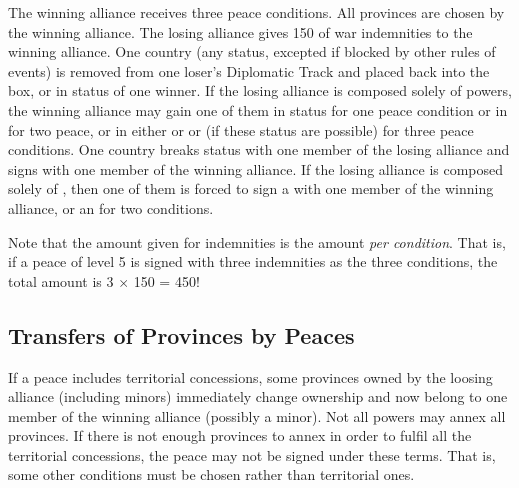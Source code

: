  The winning alliance receives
three peace conditions.
 All provinces are chosen by the winning
alliance.
\bparag[Indemnities] The losing alliance gives 150 \ducats of war indemnities
to the winning alliance.
 One country (any status, excepted if
blocked by other rules of events) is removed from one loser's Diplomatic Track
and placed back into the \Neutral box, or in \MR status of one winner. If the
losing alliance is composed solely of \MIN powers, the winning alliance may
gain one of them in \MR status for one peace condition or in \AM for two
peace, or in either \EG or \VASSAL or \ANNEXION (if these status are possible)
for three peace conditions.
 One \ROTW country breaks status with one
member of the losing alliance and signs \dipFR with one member of the winning
alliance. If the losing alliance is composed solely of \MIN, then one of them
is forced to sign a \dipFR with one member of the winning alliance, or an
\dipAT for two conditions.

\aparag[Indemnities] Note that the amount given for indemnities is the amount
\emph{per condition}. That is, if a peace of level 5 is signed with three
indemnities as the three conditions, the total amount is 3 $\times$ 150 =
450\ducats !

\subsection{Transfers of Provinces by Peaces}\label{chPeace:Transfer
  Provinces Peace}
\aparag If a peace includes territorial concessions, some provinces owned by
the loosing alliance (including minors) immediately change ownership and now
belong to one member of the winning alliance (possibly a minor).
\bparag Not all powers may annex all provinces. If there is not enough
provinces to annex in order to fulfil all the territorial concessions, the
peace may not be signed under these terms. That is, some other conditions must
be chosen rather than territorial ones.

